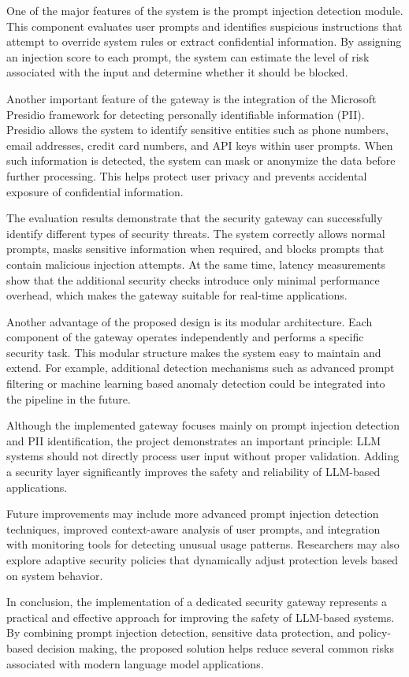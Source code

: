 \documentclass[conference]{IEEEtran}
\begin{document}
One of the major features of the system is the prompt injection detection module. This component evaluates user prompts and identifies suspicious instructions that attempt to override system rules or extract confidential information. By assigning an injection score to each prompt, the system can estimate the level of risk associated with the input and determine whether it should be blocked.

Another important feature of the gateway is the integration of the Microsoft Presidio framework for detecting personally identifiable information (PII). Presidio allows the system to identify sensitive entities such as phone numbers, email addresses, credit card numbers, and API keys within user prompts. When such information is detected, the system can mask or anonymize the data before further processing. This helps protect user privacy and prevents accidental exposure of confidential information.

The evaluation results demonstrate that the security gateway can successfully identify different types of security threats. The system correctly allows normal prompts, masks sensitive information when required, and blocks prompts that contain malicious injection attempts. At the same time, latency measurements show that the additional security checks introduce only minimal performance overhead, which makes the gateway suitable for real-time applications.

Another advantage of the proposed design is its modular architecture. Each component of the gateway operates independently and performs a specific security task. This modular structure makes the system easy to maintain and extend. For example, additional detection mechanisms such as advanced prompt filtering or machine learning based anomaly detection could be integrated into the pipeline in the future.

Although the implemented gateway focuses mainly on prompt injection detection and PII identification, the project demonstrates an important principle: LLM systems should not directly process user input without proper validation. Adding a security layer significantly improves the safety and reliability of LLM-based applications.

Future improvements may include more advanced prompt injection detection techniques, improved context-aware analysis of user prompts, and integration with monitoring tools for detecting unusual usage patterns. Researchers may also explore adaptive security policies that dynamically adjust protection levels based on system behavior.

In conclusion, the implementation of a dedicated security gateway represents a practical and effective approach for improving the safety of LLM-based systems. By combining prompt injection detection, sensitive data protection, and policy-based decision making, the proposed solution helps reduce several common risks associated with modern language model applications.
\end{document}
